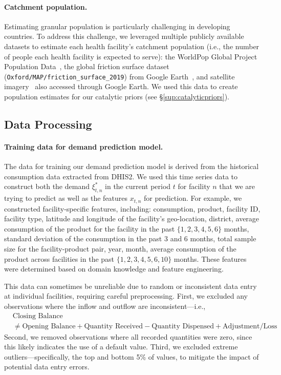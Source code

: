 \documentclass[12pt]{article}
\begin{document}
\paragraph{Catchment population.}
Estimating granular population is particularly challenging in developing countries. To address this challenge, we leveraged multiple publicly available datasets to estimate each health facility's catchment population (i.e., the number of people each health facility is expected to serve): the WorldPop Global Project Population Data~\cite{WorldPopData}, the global friction surface dataset (\verb|Oxford/MAP/friction_surface_2019|) from Google Earth~\cite{weiss2020global}, and satellite imagery~\cite{didan2015mod13q1} also accessed through Google Earth. We used this data to create population estimates for our catalytic priors (see \S\ref{sup:catalyticpriors}).

\subsection{Data Processing}
\label{sup:dataprocessing}

\paragraph{Training data for demand prediction model.} The data for training our demand prediction model is derived from the historical consumption data extracted from DHIS2. We used this time series data to construct both the demand $\xi_{t,n}^*$ in the current period $t$ for facility $n$ that we are trying to predict as well as the features $x_{t,n}$ for prediction. For example, we constructed facility-specific features, including: consumption, product, facility ID, facility type, latitude and longitude of the facility's geo-location, district, average consumption of the product for the facility in the past $\{1,2,3,4,5,6\}$ months, standard deviation of the consumption in the past 3 and 6 months, total sample size for the facility-product pair, year, month, average consumption of the product across facilities in the past $\{1,2,3,4,5,6,10\}$ months. These features were determined based on domain knowledge and feature engineering.

This data can sometimes be unreliable due to random or inconsistent data entry at individual facilities, requiring careful preprocessing. First, we excluded any observations where the inflow and outflow are inconsistent---i.e.,
\begin{align*}
&\text{Closing Balance} \\
&\neq\text{Opening Balance} + \text{Quantity Received} - \text{Quantity Dispensed} + \text{Adjustment/Loss}
\end{align*}
Second, we removed observations where all recorded quantities were zero, since this likely indicates the use of a default value. Third, we excluded extreme outliers---specifically, the top and bottom 5\% of values, to mitigate the impact of potential data entry errors.
\end{document}
